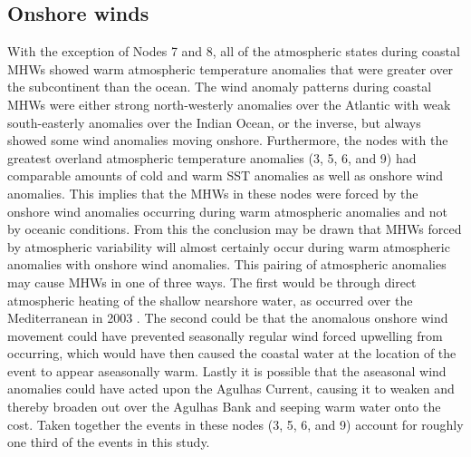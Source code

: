 \documentclass[utf8]{frontiersSCNS}
\begin{document}
\subsection{Onshore winds}
With the exception of Nodes 7 and 8, all of the atmospheric states during coastal MHWs showed warm atmospheric temperature anomalies that were greater over the subcontinent than the ocean. The wind anomaly patterns during coastal MHWs were either strong north-westerly anomalies over the Atlantic with weak south-easterly anomalies over the Indian Ocean, or the inverse, but always showed some wind anomalies moving onshore. Furthermore, the nodes with the greatest overland atmospheric temperature anomalies (3, 5, 6, and 9) had comparable amounts of cold and warm SST anomalies as well as onshore wind anomalies. This implies that the MHWs in these nodes were forced by the onshore wind anomalies occurring during warm atmospheric anomalies and not by oceanic conditions. From this the conclusion may be drawn that MHWs forced by atmospheric variability will almost certainly occur during warm atmospheric anomalies with onshore wind anomalies. This pairing of atmospheric anomalies may cause MHWs in one of three ways. The first would be through direct atmospheric heating of the shallow nearshore water, as occurred over the Mediterranean in 2003 \citep{Garrabou2009}. The second could be that the anomalous onshore wind movement could have prevented seasonally regular wind forced upwelling from occurring, which would have then caused the coastal water at the location of the event to appear aseasonally warm. Lastly it is possible that the aseasonal wind anomalies could have acted upon the Agulhas Current, causing it to weaken and thereby broaden out over the Agulhas Bank and seeping warm water onto the cost. Taken together the events in these nodes (3, 5, 6, and 9) account for roughly one third of the events in this study.
\end{document}
